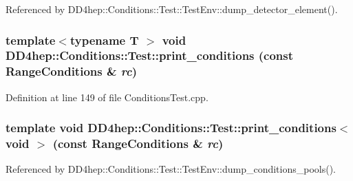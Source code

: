 Referenced by DD4hep::Conditions::Test::TestEnv::dump\_\-detector\_\-element().\hypertarget{namespace_d_d4hep_1_1_conditions_1_1_test_a09370dcb1c48fdeb75b180903e0af2d0}{
\subsubsection[{print\_\-conditions}]{\setlength{\rightskip}{0pt plus 5cm}template$<$typename T $>$ void DD4hep::Conditions::Test::print\_\-conditions (const RangeConditions \& {\em rc})}}
\label{namespace_d_d4hep_1_1_conditions_1_1_test_a09370dcb1c48fdeb75b180903e0af2d0}


Definition at line 149 of file ConditionsTest.cpp.\hypertarget{namespace_d_d4hep_1_1_conditions_1_1_test_acdce8ace7d03579186b713f0c76b0a15}{
\subsubsection[{print\_\-conditions$<$ void $>$}]{\setlength{\rightskip}{0pt plus 5cm}template void DD4hep::Conditions::Test::print\_\-conditions$<$ void $>$ (const RangeConditions \& {\em rc})}}
\label{namespace_d_d4hep_1_1_conditions_1_1_test_acdce8ace7d03579186b713f0c76b0a15}


Referenced by DD4hep::Conditions::Test::TestEnv::dump\_\-conditions\_\-pools().